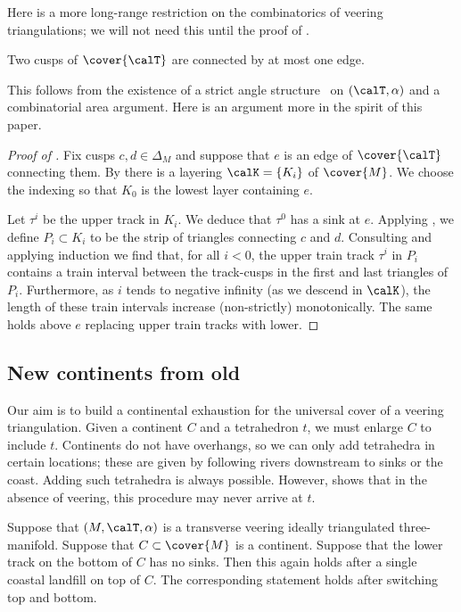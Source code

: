 \documentclass[12pt]{amsart}
\begin{document}
Here is a more long-range restriction on the combinatorics of veering triangulations; we will not need this until the proof of .

\begin{lemma}
\label{Lem:NoParallelEdges}
Two cusps of $\cover{\calT}$ are connected by at most one edge.
\end{lemma}

This follows from the existence of a strict angle structure~\cite{HRST11, FuterGueritaud13} on $(\calT, \alpha)$ and a combinatorial area argument.  Here is an argument more in the spirit of this paper. 

\begin{proof}[Proof of ]
Fix cusps $c, d \in \Delta_M$ and suppose that $e$ is an edge of $\cover{\calT}$ connecting them.  By  there is a layering $\calK = \{K_i\}$ of $\cover{M}$.  We choose the indexing so that $K_0$ is the lowest layer containing $e$.  

Let $\tau^i$ be the upper track in $K_i$.  We deduce that $\tau^0$ has a sink at $e$.  Applying , we define $P_i \subset K_i$ to be the strip of triangles connecting $c$ and $d$.  Consulting  and applying induction we find that, for all $i < 0$, the upper train track $\tau^i$ in $P_i$ contains a train interval between the track-cusps in the first and last triangles of $P_i$.  Furthermore, as $i$ tends to negative infinity (as we descend in $\calK$), the length of these train intervals increase (non-strictly) monotonically.  The same holds above $e$ replacing upper train tracks with lower.
\end{proof}

\subsection{New continents from old}

Our aim is to build a continental exhaustion for the universal cover of a veering triangulation. Given a continent $C$ and a tetrahedron $t$, we must enlarge $C$ to include $t$. Continents do not have overhangs, so we can only add tetrahedra in certain locations; these are given by following rivers downstream to sinks or the coast. Adding such tetrahedra is always possible. However,  shows that in the absence of veering, this procedure may never arrive at $t$. 

\begin{lemma}
\label{Lem:NoNewSinks}
Suppose that $(M, \calT, \alpha)$ is a transverse veering ideally triangulated three-manifold.  
Suppose that $C \subset \cover{M}$ is a continent.  Suppose that the lower track on the bottom of $C$ has no sinks.  Then this again holds after a single coastal landfill on top of $C$.  The corresponding statement holds after switching top and bottom. 
\end{lemma}
\end{document}
